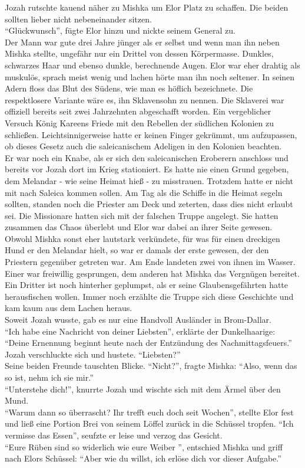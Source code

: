 Jozah rutschte kauend näher zu Mishka um Elor Platz zu schaffen. Die beiden sollten lieber nicht 
nebeneinander sitzen.\\
``Glückwunsch'', fügte Elor hinzu und nickte seinem General zu.\\
Der Mann war gute drei Jahre jünger als er selbst und wenn man ihn neben Mishka stellte, ungefähr 
nur ein Drittel von dessen Körpermasse. Dunkles, schwarzes Haar und ebenso dunkle, berechnende 
Augen. Elor war eher drahtig als muskulös, sprach meist wenig und lachen hörte man ihn noch 
seltener. In seinen Adern floss das Blut des Südens, wie man es höflich bezeichnete. Die 
respektlosere Variante wäre es, ihn Sklavensohn zu nennen. Die Sklaverei war offiziell bereits seit 
zwei Jahrzehnten abgeschafft worden. Ein vergeblicher Versuch König Kareens Friede mit den Rebellen 
der südlichen Kolonien zu schließen. Leichtsinnigerweise hatte er keinen Finger gekrümmt, um 
aufzupassen, ob dieses Gesetz auch die saleicanischem Adeligen in den Kolonien beachten.\\
Er war noch ein Knabe, als er sich den saleicanischen Eroberern anschloss und bereits vor Jozah 
dort im Krieg stationiert. Es hatte nie einen Grund gegeben, dem Melandar - wie seine Heimat hieß - 
zu misstrauen. Trotzdem hatte er nicht mit nach Saleica kommen sollen. Am Tag als die Schiffe in 
die Heimat segeln sollten, standen noch die Priester am Deck und zeterten, dass dies nicht erlaubt 
sei. Die Missionare hatten sich mit der falschen Truppe angelegt. Sie hatten zusammen das Chaos 
überlebt und Elor war dabei an ihrer Seite gewesen. Obwohl Mishka sonst eher lautstark verkündete, 
für was für einen dreckigen Hund er den Melandar hielt, so war er damals der erste gewesen, der den 
Priestern gegenüber getreten war. Am Ende landeten zwei von ihnen im Wasser. Einer war freiwillig 
gesprungen, dem anderen hat Mishka das Vergnügen bereitet. Ein Dritter ist noch hinterher 
geplumpst, als er seine Glaubensgefährten hatte herausfischen wollen. Immer noch erzählte die 
Truppe sich diese Geschichte und kam kaum aus dem Lachen heraus.\\
Soweit Jozah wusste, gab es nur eine Handvoll Ausländer in Brom-Dallar.\\
``Ich habe eine Nachricht von deiner Liebsten'', erklärte der Dunkelhaarige: ``Deine Ernennung 
beginnt heute nach der Entzündung des Nachmittagsfeuers.''\\
Jozah verschluckte sich und hustete. ``Liebsten?''\\
Seine beiden Freunde tauschten Blicke. ``Nicht?'', fragte Mishka: ``Also, wenn das so ist, nehm ich 
sie mir.''\\
``Unterstehe dich!'', knurrte Jozah und wischte sich mit dem Ärmel über den Mund.\\
``Warum dann so überrascht? Ihr trefft euch doch seit Wochen'', stellte Elor fest und ließ eine 
Portion Brei von seinem Löffel zurück in die Schüssel tropfen. ``Ich vermisse das Essen'', seufzte 
er leise und verzog das Gesicht.\\
``Eure Rüben sind so widerlich wie eure Weiber '', entschied Mishka und griff nach Elors Schüssel: 
``Aber wie du willst, ich erlöse dich vor dieser Aufgabe.''\\


